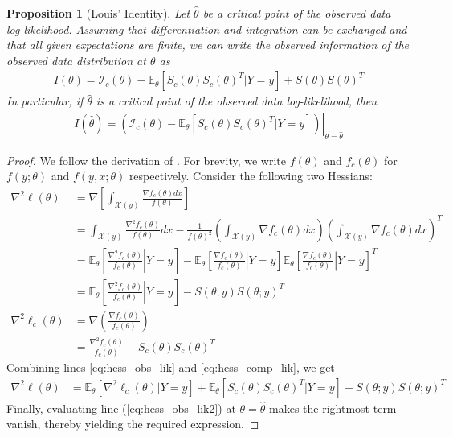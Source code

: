 \documentclass[11pt, oneside]{article}   	%
\newcommand{\bE}{\mathbb{E}}
\newtheorem{proposition}{Proposition}[section]
\begin{document}
\begin{proposition}[Louis' Identity]
    \label{thm2:info_decomp}
    Let $\hat{\theta}$ be a critical point of the observed data log-likelihood. Assuming that differentiation and integration can be exchanged and that all given expectations are finite, we can write the observed information of the observed data distribution at $\theta$ as
    \begin{align}
        I(\theta) = \mathcal{I}_c(\theta) - \bE_{\theta} [ S_c(\theta) S_c(\theta)^T | Y=y] + S(\theta) S(\theta)^T
    \end{align}
    In particular, if $\hat{\theta}$ is a critical point of the observed data log-likelihood, then
    \begin{align}
        I(\hat{\theta}) = \left. \left(\mathcal{I}_c(\theta)  -  \bE_{\theta} [ S_c(\theta) S_c(\theta)^T | Y=y]\right) \right|_{\theta = \hat{\theta}} \label{eq:info_at_MLE}
    \end{align}
\end{proposition}

\begin{proof}
    We follow the derivation of \citet{Lou82}. For brevity, we write $f(\theta)$ and $f_c(\theta)$ for $f(y; \theta)$ and $f(y, x; \theta)$ respectively. Consider the following two Hessians:
    \begin{align}
        \nabla^2 \ell(\theta) &= \nabla \left[ \int_{\mathcal{X}(y)} \frac{\nabla f_c(\theta) dx}{f(\theta)} \right]\\
        &= \int_{\mathcal{X}(y)} \frac{\nabla^2 f_c(\theta)}{f(\theta)} dx - \frac{1}{f(\theta)^2}\left( \int_{\mathcal{X}(y)} \nabla f_c(\theta) dx \right) \left( \int_{\mathcal{X}(y)} \nabla f_c(\theta) dx \right)^T\\
        &= \bE_\theta \left[ \left. \frac{\nabla^2 f_c(\theta)}{f_c(\theta)} \right| Y=y \right] - \bE_\theta \left[ \left. \frac{\nabla f_c(\theta)}{f_c(\theta)} \right| Y=y \right] \bE_\theta \left[ \left. \frac{\nabla f_c(\theta)}{f_c(\theta)} \right| Y=y \right]^T\\
        &= \bE_\theta \left[ \left. \frac{\nabla^2 f_c(\theta)}{f_c(\theta)} \right| Y=y \right] - S(\theta; y) S(\theta; y)^T \label{eq:hess_obs_lik}\\
        \nabla^2 \ell_c(\theta) &= \nabla \left( \frac{\nabla f_c(\theta)}{f_c(\theta)} \right)\\
        &= \frac{\nabla^2 f_c(\theta)}{f_c(\theta)} - S_c(\theta) S_c(\theta)^T \label{eq:hess_comp_lik}
    \end{align}
    Combining lines \ref{eq:hess_obs_lik} and \ref{eq:hess_comp_lik}, we get
    \begin{align}
        \nabla^2 \ell(\theta) &= \bE_\theta [ \nabla^2 \ell_c(\theta) | Y=y] + \bE_\theta [ S_c(\theta) S_c(\theta)^T | Y=y] - S(\theta; y) S(\theta; y)^T \label{eq:hess_obs_lik2}
    \end{align}
    Finally, evaluating line (\ref{eq:hess_obs_lik2}) at $\theta = \hat{\theta}$ makes the rightmost term vanish, thereby yielding the required expression.
\end{proof}
\end{document}
